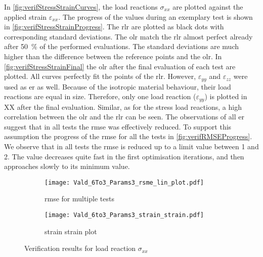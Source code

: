 In \autoref{fig:verifStressStrainCurves}, the load reactions $\sigma_{xx}$ are plotted against the applied strain $\varepsilon_{xx}$. The progress of the values during an exemplary test is shown in \autoref{fig:verifStressStrainProgress}. The \acrlong{rlr} are plotted as black dots with corresponding standard deviations. The \acrlong{olr} match the \acrlong{rlr} almost perfect already after 50 \% of the performed evaluations. The standard deviations are much higher than the difference between the reference points and the \acrlong{olr}. In \autoref{fig:verifStressStrainFinal} the \acrlong{olr} after the final evaluation of each test are plotted. All curves perfectly fit the points of the \acrlong{rlr}. However, $\varepsilon_{yy}$ and $\varepsilon_{zz}$ were used as \acrlong{er} as well. Because of the isotropic material behaviour, their load reactions are equal in size. Therefore, only one load reaction ($\varepsilon_{yy}$) is plotted in XX after the final evaluation. Similar, as for the stress load reactions, a high correlation between the \acrlong{olr} and the \acrlong{rlr} can be seen. The observations of all \acrlong{er} suggest that in all tests the \acrshort{rmse} was effectively reduced. To support this assumption the progress of the \acrshort{rmse} for all the tests in \autoref{fig:verifRMSEProgress}. We observe that in all tests the \acrshort{rmse} is reduced up to a limit value between 1 and 2. The value decreases quite fast in the first optimisation iterations, and then approaches slowly to its minimum value.

\begin{figure}[H]
\centering
\begin{subfigure}[t]{0.495\textwidth}
    \centering
    \texttt{[image: Vald\_6To3\_Params3\_rsme\_lin\_plot.pdf]}
    \caption{rmse for multiple tests}
    \label{fig:verifRMSEProgress}
\end{subfigure}
\hfill
\begin{subfigure}[t]{0.495\textwidth}
    \centering
    \centering
    \texttt{[image: Vald\_6to3\_Params3\_strain\_strain.pdf]}
    \caption{strain strain plot}
    \label{fig:verfiStrainStrain}
\end{subfigure}
\caption{Verification results for load reaction $\sigma_{xx}$}
\label{fig:voceAndRMSEVerif}
\end{figure}

